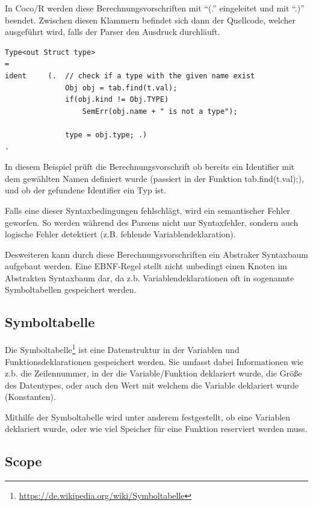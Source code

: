 In Coco/R werden diese Berechnungsvorschriften mit ``(.'' eingeleitet und mit ``.)'' beendet. Zwischen diesen Klammern befindet sich dann der Quellcode, welcher ausgef\"uhrt wird, falls der Parser den Ausdruck durchl\"auft.


\begin{lstlisting}[language=EBNF]
Type<out Struct type>
= 
ident     (.  // check if a type with the given name exist
              Obj obj = tab.find(t.val);
              if(obj.kind != Obj.TYPE)
                  SemErr(obj.name + " is not a type");

              type = obj.type; .)
. 
\end{lstlisting}

In diesem Beispiel pr\"uft die Berechnungsvorschrift ob bereits ein Identifier mit dem gew\"ahlten Namen definiert wurde (passiert in der Funktion tab.find(t.val);), und ob der gefundene Identifier ein Typ ist. 

Falls eine dieser Syntaxbedingungen fehlschl\"agt, wird ein semantischer Fehler geworfen. So werden w\"ahrend des Parsens nicht nur Syntaxfehler, sondern auch logische Fehler detektiert (z.B. fehlende Variablendeklaration).

Desweiteren kann durch diese Berechnungsvorschriften ein Abstraker Syntaxbaum aufgebaut werden. Eine EBNF-Regel stellt nicht unbedingt einen Knoten im Abstrakten Syntaxbaum dar, da z.b. Variablendeklarationen oft in sogenannte Symboltabellen gespeichert werden.

\subsection{Symboltabelle}

Die Symboltabelle\footnote{\url{https://de.wikipedia.org/wiki/Symboltabelle}} ist eine Datenstruktur in der Variablen und Funktionsdeklarationen gespeichert werden. Sie umfasst dabei Informationen wie z.b. die Zeilennummer, in der die Variable/Funktion deklariert wurde, die Gr\"o\ss{}e des Datentypes, oder auch den Wert mit welchem die Variable deklariert wurde (Konstanten).

Mithilfe der Symboltabelle wird unter anderem festgestellt, ob eine Variablen deklariert wurde, oder wie viel Speicher f\"ur eine Funktion reserviert werden muss.


\subsection{Scope}